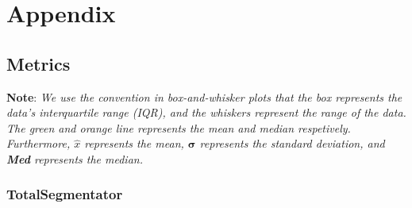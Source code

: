 \documentclass[11pt,twoside]{report}
\begin{document}

\clearpage

\appendix

\chapter{Appendix}

\section{Metrics}

\textbf{Note}: \textit{We use the convention in box-and-whisker plots that the box represents the data's interquartile range (IQR), and the whiskers represent the range of the data. The green and orange line represents the mean and median respetively. Furthermore, $\hat{x}$ represents the mean, $\mathbf\sigma$ represents the standard deviation, and \textbf{Med} represents the median.}

\subsection{TotalSegmentator}\label{sect:totalsegmentator-Appendix}

\begin{table}[h!]
  \centering
  \caption{Added Path Length scores across each anatomy using TotalSegmentator}
  \label{tab:totalsegmentator-apl}
\end{table}
\end{document}
